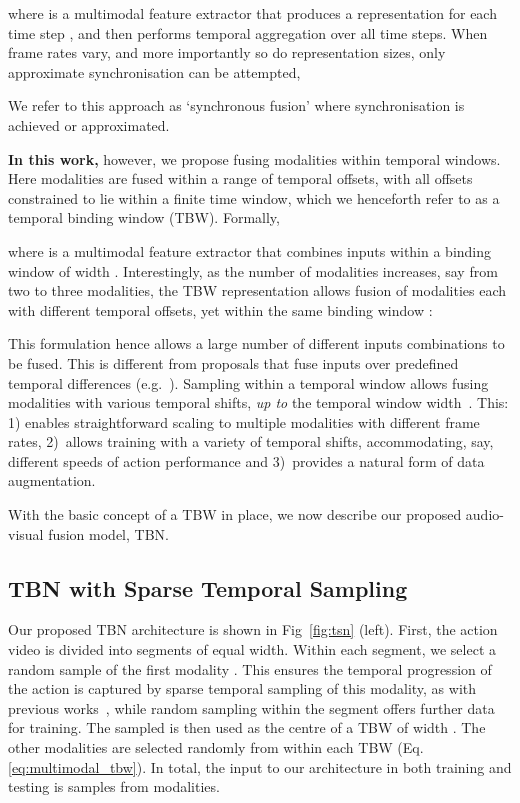 \documentclass[10pt,twocolumn,letterpaper]{article}
\begin{document}
where  is a multimodal feature extractor that produces a representation for each time step , and  then performs temporal aggregation over all time steps. When frame rates vary, and more importantly so do representation sizes,  only approximate synchronisation can be attempted,

We refer to this approach as `synchronous fusion' where synchronisation is achieved or approximated.

\textbf{In this work,} however, we propose fusing modalities within temporal windows. Here modalities are fused within a range of temporal offsets, with all offsets constrained to lie within a finite time window, which we henceforth refer to as a temporal binding window (TBW). Formally,

where  is a multimodal feature extractor that combines inputs within a binding window of width .
Interestingly, as the number of modalities increases, say from two to three modalities, the TBW representation allows fusion of modalities each with different temporal offsets, yet within the same binding window :

\vspace*{-8pt}
{\footnotesize{
 }}
\vspace*{-8pt}

\noindent This formulation hence allows a large number of different inputs combinations to be fused. 
This is different from proposals that fuse inputs over predefined temporal differences (e.g.~\cite{async_fusion}). Sampling within a temporal window allows fusing modalities with various temporal shifts, \textit{up to} the temporal window width~. This: 1) enables straightforward scaling to multiple modalities with different frame rates, 2)~allows training with a variety of temporal shifts, accommodating, say, different speeds of action performance and 3)~provides a natural form of data augmentation.

With the basic concept of a TBW in place, we now describe our proposed audio-visual fusion model, TBN. 




\subsection{TBN with Sparse Temporal Sampling}
\label{sec:method:arch}
Our proposed TBN architecture is shown in Fig~\ref{fig:tsn} (left).
First, the action video is divided into  segments of equal width.
Within each segment, we select a random sample of the first modality .
This ensures the temporal progression of the action is captured by sparse temporal sampling of this modality, as with previous works~\cite{TSN2016ECCV,Zhou_2018_ECCV}, while random sampling within the segment offers further data for training.
The sampled  is then used as the centre of a TBW of width .
The other modalities are selected randomly from within each TBW (Eq. \ref{eq:multimodal_tbw}).
In total, the input to our architecture in both training and testing is  samples from  modalities.
\end{document}
